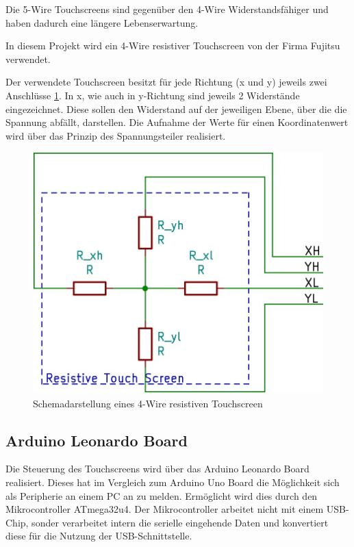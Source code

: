 Die 5-Wire Touchscreens sind gegenüber den 4-Wire Widerstandsfähiger und haben dadurch eine längere Lebenserwartung.\cite{5w4w}

In diesem Projekt wird ein 4-Wire resistiver Touchscreen von der Firma Fujitsu verwendet.

Der verwendete Touchscreen besitzt für jede Richtung (x und y) jeweils zwei Anschlüsse \cref{fig:4w}.
In x, wie auch in y-Richtung sind jeweils 2 Widerstände eingezeichnet.
Diese sollen den Widerstand auf der jeweiligen Ebene, über die die Spannung abfällt, darstellen.
Die Aufnahme der Werte für einen Koordinatenwert wird über das Prinzip des Spannungsteiler realisiert.
\begin{figure}
    \centering
    \includegraphics[width=0.6\linewidth]{fig/4-wire.jpg}
    \caption{Schemadarstellung eines 4-Wire resistiven Touchscreen}
    \label{fig:4w}
\end{figure}
\subsection{Arduino Leonardo Board}
Die Steuerung des Touchscreens wird über das Arduino Leonardo Board realisiert. 
Dieses hat im Vergleich zum Arduino Uno Board die Möglichkeit sich als Peripherie an einem PC an zu melden.
Ermöglicht wird dies durch den Mikrocontroller ATmega32u4.
Der Mikrocontroller arbeitet nicht mit einem USB-Chip, sonder verarbeitet intern die serielle eingehende Daten und konvertiert diese für die Nutzung der USB-Schnittstelle.

